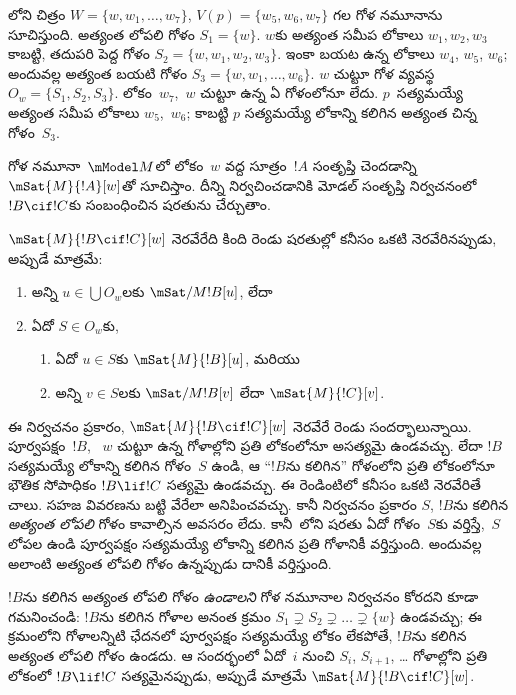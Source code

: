 \documentclass[../../../include/open-logic-section]{subfiles}
\begin{document}
లోని చిత్రం
$W = \{w, w_1, \dots, w_7\}$,
$V(p) = \{w_5, w_6,
w_7\}$ గల గోళ నమూనాను
సూచిస్తుంది. అత్యంత లోపలి
గోళం $S_1 = \{w\}$.
$w$కు అత్యంత సమీప లోకాలు
$w_1, w_2, w_3$ కాబట్టి,
తదుపరి పెద్ద గోళం
$S_2 = \{w, w_1,
w_2, w_3\}$. ఇంకా బయట
ఉన్న లోకాలు $w_4$, $w_5$,
$w_6$; అందువల్ల అత్యంత
బయటి గోళం $S_3 = \{w,
w_1, \dots, w_6\}$.
$w$ చుట్టూ గోళ వ్యవస్థ
$O_w = \{S_1, S_2, S_3\}$.
లోకం~$w_7$,~$w$ చుట్టూ
ఉన్న ఏ గోళంలోనూ లేదు.
$p$~సత్యమయ్యే అత్యంత
సమీప లోకాలు $w_5$,~$w_6$;
కాబట్టి $p$ సత్యమయ్యే
లోకాన్ని కలిగిన అత్యంత చిన్న
గోళం~$S_3$.

గోళ నమూనా~$\mModel M$లో
లోకం~$w$ వద్ద సూత్రం~$!A$
సంతృప్తి చెందడాన్ని $\mSat{M}{!A}[w]$తో సూచిస్తాం. దీన్ని నిర్వచించడానికి
మోడల్  సంతృప్తి నిర్వచనంలో
$!B \cif !C$కు సంబంధించిన షరతును చేర్చుతాం.

\begin{defn}
  $\mSat{M}{!B \cif !C}[w]$
నెరవేరేది కింది రెండు షరతుల్లో కనీసం ఒకటి నెరవేరినప్పుడు, అప్పుడే మాత్రమే:
  \begin{enumerate}
  \item{} అన్ని $u \in \bigcup O_w$లకు
    $\mSat/{M}{!B}[u]$, లేదా
  \item{} ఏదో $S \in O_w$కు,
    \begin{enumerate}
      \item ఏదో $u \in
        S$కు $\mSat{M}{!B}[u]$,
        మరియు
      \item అన్ని $v \in S$లకు
        $\mSat/{M}{!B}[v]$ లేదా
        $\mSat{M}{!C}[v]$.
    \end{enumerate}
  \end{enumerate}
\end{defn}

ఈ నిర్వచనం ప్రకారం,
$\mSat{M}{!B \cif !C}[w]$
నెరవేరే రెండు సందర్భాలున్నాయి. పూర్వపక్షం~$!B$,
~$w$ చుట్టూ ఉన్న గోళాల్లోని ప్రతి లోకంలోనూ
అసత్యమై ఉండవచ్చు. లేదా $!B$
సత్యమయ్యే లోకాన్ని కలిగిన గోళం~$S$ ఉండి,
ఆ ``$!B$ను కలిగిన'' గోళంలోని
ప్రతి లోకంలోనూ భౌతిక సోపాధికం
$!B \lif !C$ సత్యమై ఉండవచ్చు.
ఈ రెండింటిలో కనీసం ఒకటి నెరవేరితే చాలు. సహజ
వివరణను బట్టి వేరేలా అనిపించవచ్చు. కానీ
నిర్వచనం ప్రకారం $S$,
$!B$ను కలిగిన \emph{అత్యంత లోపలి}
గోళం కావాల్సిన అవసరం లేదు.
కానీ~లోని
షరతు ఏదో గోళం~$S$కు
వర్తిస్తే,~$S$ లోపల ఉండి
పూర్వపక్షం సత్యమయ్యే లోకాన్ని కలిగిన ప్రతి గోళానికీ
వర్తిస్తుంది. అందువల్ల అలాంటి
అత్యంత లోపలి గోళం ఉన్నప్పుడు
దానికీ వర్తిస్తుంది.

$!B$ను కలిగిన అత్యంత
లోపలి గోళం \emph{ఉండాలని}
గోళ నమూనాల నిర్వచనం
కోరదని కూడా గమనించండి:
$!B$ను కలిగిన గోళాల
అనంత క్రమం $S_1
\supsetneq S_2 \supsetneq
\dots \supsetneq
\{w\}$ ఉండవచ్చు;
ఈ క్రమంలోని గోళాలన్నిటి ఛేదనలో పూర్వపక్షం సత్యమయ్యే
లోకం లేకపోతే, $!B$ను కలిగిన అత్యంత లోపలి గోళం ఉండదు.
ఆ సందర్భంలో ఏదో~$i$ నుంచి $S_i$, $S_{i+1}$, \dots
గోళాల్లోని ప్రతి లోకంలో $!B \lif !C$ సత్యమైనప్పుడు, అప్పుడే మాత్రమే
$\mSat{M}{!B \cif !C}[w]$.
\end{document}
